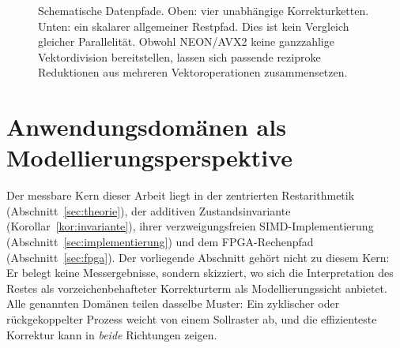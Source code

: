 \documentclass[11pt,a4paper]{scrartcl}
\theoremstyle{definition}
\theoremstyle{plain}
\theoremstyle{remark}
\begin{document}
\begin{figure}[htbp]
\centering
{}
\caption{Schematische Datenpfade. Oben: vier unabhängige Korrekturketten. Unten: ein skalarer allgemeiner Restpfad. Dies ist kein Vergleich gleicher Parallelität. Obwohl NEON/AVX2 keine ganzzahlige Vektordivision bereitstellen, lassen sich passende reziproke Reduktionen aus mehreren Vektoroperationen zusammensetzen.}
\label{fig:simdlanes}
\end{figure}

\section{Anwendungsdomänen als Modellierungsperspektive}
\label{sec:anwendungen}

Der messbare Kern dieser Arbeit liegt in der zentrierten Restarithmetik (Abschnitt~\ref{sec:theorie}), der additiven Zustandsinvariante (Korollar~\ref{kor:invariante}), ihrer verzweigungsfreien SIMD-Implementierung (Abschnitt~\ref{sec:implementierung}) und dem FPGA-Rechenpfad (Abschnitt~\ref{sec:fpga}). Der vorliegende Abschnitt gehört nicht zu diesem Kern: Er belegt keine Messergebnisse, sondern skizziert, wo sich die Interpretation des Restes als vorzeichenbehafteter Korrekturterm als Modellierungssicht anbietet. Alle genannten Domänen teilen dasselbe Muster: Ein zyklischer oder rückgekoppelter Prozess weicht von einem Sollraster ab, und die effizienteste Korrektur kann in \emph{beide} Richtungen zeigen.
\end{document}
